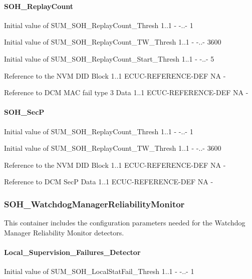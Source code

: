 \paragraph{SOH_ReplayCount}

{
{Initial value of SUM_SOH_ReplayCount_Thresh}
{1..1}
{-}
{-..-}
{1}}

{
{Initial value of SUM_SOH_ReplayCount_TW_Thresh}
{1..1}
{-}
{-..-}
{3600}}

{
{Initial value of SUM_SOH_ReplayCount_Start_Thresh}
{1..1}
{-}
{-..-}
{5}}

{
{Reference to the NVM DID Block}
{1..1}
{ECUC-REFERENCE-DEF}
{NA}
{-}}

{
{Reference to DCM MAC fail type 3 Data}
{1..1}
{ECUC-REFERENCE-DEF}
{NA}
{-}}

\paragraph{SOH_SecP}

{
{Initial value of SUM_SOH_ReplayCount_Thresh}
{1..1}
{-}
{-..-}
{1}}

{
{Initial value of SUM_SOH_ReplayCount_TW_Thresh}
{1..1}
{-}
{-..-}
{3600}}

{
{Reference to the NVM DID Block}
{1..1}
{ECUC-REFERENCE-DEF}
{NA}
{-}}

{
{Reference to DCM SecP Data}
{1..1}
{ECUC-REFERENCE-DEF}
{NA}
{-}}

\subsubsection{SOH\_WatchdogManagerReliabilityMonitor}
This container includes the configuration parameters needed for the Watchdog Manager Reliability Monitor detectors.


\paragraph{Local\_Supervision\_Failures\_Detector}
{
{Initial value of SUM_SOH_LocalStatFail_Thresh}
{1..1}
{-}
{-..-}
{1}}


